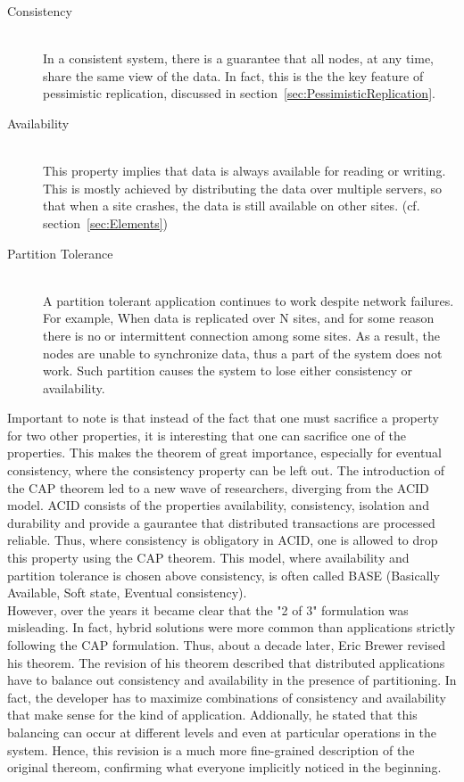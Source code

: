 \documentclass[a4paper,12pt]{report}
\begin{document}
\begin{description}
 \item[Consistency] \hfill \\In a consistent system, there is a guarantee that all nodes, at any time, share the same view of the data. In fact, this is the the key feature of pessimistic replication, discussed in section~\ref{sec:PessimisticReplication}.
 \item[Availability] \hfill \\This property implies that data is always available for reading or writing. This is mostly achieved by distributing the data over multiple servers, so that when a site crashes, the data is still available on other sites. (cf. section~\ref{sec:Elements})
 \item[Partition Tolerance] \hfill \\A partition tolerant application continues to work despite network failures. For example, When data is replicated over N sites, and for some reason there is no or intermittent connection among some sites. As a result, the nodes are unable to synchronize data, thus a part of the system does not work. Such partition causes the system to lose either consistency or availability.
\end{description}

Important to note is that instead of the fact that one must sacrifice a property for two other properties, it is interesting that one can sacrifice one of the properties. This makes the theorem of great importance, especially for eventual consistency, where the consistency property can be left out. The introduction of the CAP theorem led to a new wave of researchers, diverging from the ACID model. ACID consists of the properties availability, consistency, isolation and durability and provide a gaurantee that distributed transactions are processed reliable. Thus, where consistency is obligatory in ACID, one is allowed to drop this property using the CAP theorem. This model, where availability and partition tolerance is chosen above consistency, is often called BASE (Basically Available, Soft state, Eventual consistency). \\
However, over the years it became clear that the "2 of 3" formulation was misleading. In fact, hybrid solutions were more common than applications strictly following the CAP formulation. Thus, about a decade later, Eric Brewer revised his theorem. The revision of his theorem described that distributed applications have to balance out consistency and availability in the presence of partitioning. In fact, the developer has to maximize combinations of consistency and availability that make sense for the kind of application. Addionally, he stated that this balancing can occur at different levels and even at particular operations in the system. Hence, this revision is a much more fine-grained description of the original thereom, confirming what everyone implicitly noticed in the beginning. 
\end{document}
